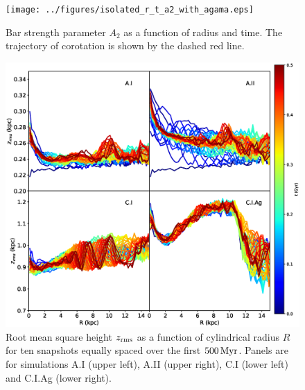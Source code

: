 \begin{figure}
	\centering
	\texttt{[image: ../figures/isolated\_r\_t\_a2\_with\_agama.eps]}
	\caption{Bar strength parameter $A_2$ as a function of radius
          and time.  The trajectory of corotation is shown by the
          dashed red line.} \label{fig:isolated_r_t_a2}
\end{figure}

\begin{figure}
	\centering
	\includegraphics[width=\textwidth]{../figures/isolated_four_panel_zrms.eps}
	\caption{Root mean square height $z_{\rm rms}$ as a function of
          cylindrical radius $R$ for ten snapshots equally spaced over
          the first $500\,{\rm Myr}$.  Panels are for simulations A.I
          (upper left), A.II (upper right), C.I (lower left) and
          C.I.Ag (lower right).} \label{fig:zrms}
\end{figure}

